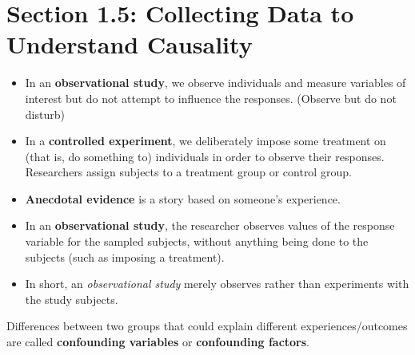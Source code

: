 \documentclass[../mathNotesPreamble]{subfiles}
\begin{document}
  \section{Section 1.5: Collecting Data to Understand Causality}
    \begin{defn*}
      \begin{itemize}
        \item In an \textbf{observational study}, we observe individuals and measure variables of interest but do not attempt to influence the responses. (Observe but do not disturb)
        \item In a \textbf{controlled experiment}, we deliberately impose some treatment on (that is, do something to) individuals in order to observe their responses. Researchers assign subjects to a treatment group or control group.
        \item \textbf{Anecdotal evidence} is a story based on someone’s experience.
      \end{itemize}
    \end{defn*}
    
    \begin{itemize}
      \item In an \textbf{observational study}, the researcher observes values of the response variable for the sampled subjects, without anything being done to the subjects (such as imposing a treatment).
      \item In short, an \emph{observational study} merely observes rather than experiments with the study subjects. 
    \end{itemize}
    \begin{center}
    \end{center}

    \begin{defn*}
      Differences between two groups that could explain different experiences/outcomes are called \textbf{confounding variables} or \textbf{confounding factors}.
    \end{defn*}
  \pagebreak
  
\end{document}
